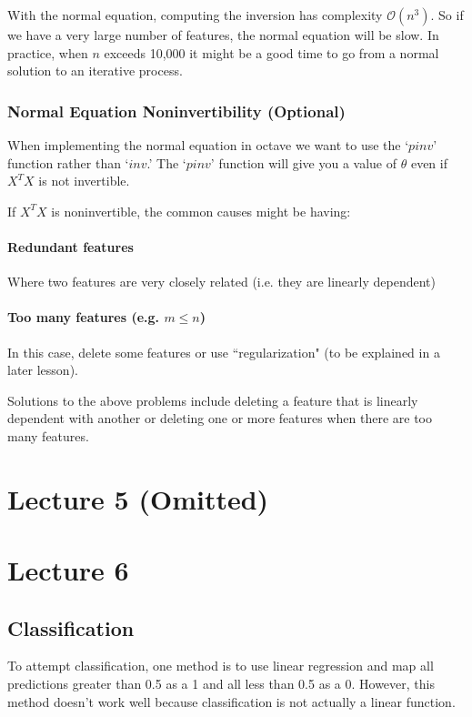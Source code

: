 \documentclass[UTF8]{article}
\begin{document}
With the normal equation, computing the inversion has complexity $\mathcal{O}(n^3)$. So if we have a very large number of features, the normal equation will be slow. In practice, when $n$ exceeds 10,000 it might be a good time to go from a normal solution to an iterative process.

\subsubsection{Normal Equation Noninvertibility (Optional)}

When implementing the normal equation in octave we want to use the `$pinv$' function rather than `$inv$.' The `$pinv$' function will give you a value of $\theta$ even if $X^T X$ is not invertible.

If $X^T X$ is noninvertible, the common causes might be having:

\paragraph{Redundant features} Where two features are very closely related (i.e. they are linearly dependent)

\paragraph{Too many features (e.g. $m \le n$)} In this case, delete some features or use ``regularization" (to be explained in a later lesson).

Solutions to the above problems include deleting a feature that is linearly dependent with another or deleting one or more features when there are too many features.

\section{Lecture 5 (Omitted)}

\newpage

\section{Lecture 6}

\subsection{Classification}

To attempt classification, one method is to use linear regression and map all predictions greater than 0.5 as a 1 and all less than 0.5 as a 0. However, this method doesn't work well because classification is not actually a linear function.
\end{document}
